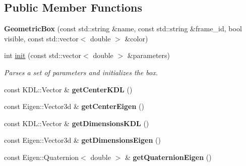 \subsection*{Public Member Functions}
\begin{DoxyCompactItemize}
\item 
\hypertarget{classhiqp_1_1geometric__primitives_1_1GeometricBox_aa52d023049089c48fe4d58e1abda191e}{{\bfseries Geometric\-Box} (const std\-::string \&name, const std\-::string \&frame\-\_\-id, bool visible, const std\-::vector$<$ double $>$ \&color)}\label{classhiqp_1_1geometric__primitives_1_1GeometricBox_aa52d023049089c48fe4d58e1abda191e}

\item 
int \hyperlink{classhiqp_1_1geometric__primitives_1_1GeometricBox_aae7d637b515e2b35c901a7e2fb5dd6cd}{init} (const std\-::vector$<$ double $>$ \&parameters)
\begin{DoxyCompactList}\small\item\em Parses a set of parameters and initializes the box. \end{DoxyCompactList}\item 
\hypertarget{classhiqp_1_1geometric__primitives_1_1GeometricBox_acfb9b2388e5219895e5d5818fc0309d9}{const K\-D\-L\-::\-Vector \& {\bfseries get\-Center\-K\-D\-L} ()}\label{classhiqp_1_1geometric__primitives_1_1GeometricBox_acfb9b2388e5219895e5d5818fc0309d9}

\item 
\hypertarget{classhiqp_1_1geometric__primitives_1_1GeometricBox_a419fd54ee9d68557fde580047d674d2a}{const Eigen\-::\-Vector3d \& {\bfseries get\-Center\-Eigen} ()}\label{classhiqp_1_1geometric__primitives_1_1GeometricBox_a419fd54ee9d68557fde580047d674d2a}

\item 
\hypertarget{classhiqp_1_1geometric__primitives_1_1GeometricBox_a25e529e27e5cf1ea193f09b6a3c52e38}{const K\-D\-L\-::\-Vector \& {\bfseries get\-Dimensions\-K\-D\-L} ()}\label{classhiqp_1_1geometric__primitives_1_1GeometricBox_a25e529e27e5cf1ea193f09b6a3c52e38}

\item 
\hypertarget{classhiqp_1_1geometric__primitives_1_1GeometricBox_a77f1de122e7860e9951efb118287765b}{const Eigen\-::\-Vector3d \& {\bfseries get\-Dimensions\-Eigen} ()}\label{classhiqp_1_1geometric__primitives_1_1GeometricBox_a77f1de122e7860e9951efb118287765b}

\item 
\hypertarget{classhiqp_1_1geometric__primitives_1_1GeometricBox_ab1e112b2af3cc6982a742ee641056bfb}{const Eigen\-::\-Quaternion$<$ double $>$ \& {\bfseries get\-Quaternion\-Eigen} ()}\label{classhiqp_1_1geometric__primitives_1_1GeometricBox_ab1e112b2af3cc6982a742ee641056bfb}


\end{DoxyCompactItemize}
